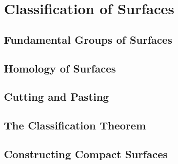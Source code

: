 \chapter{Classification of Surfaces}

\section{Fundamental Groups of Surfaces}

\section{Homology of Surfaces}

\section{Cutting and Pasting}

\section{The Classification Theorem}

\section{Constructing Compact Surfaces}

